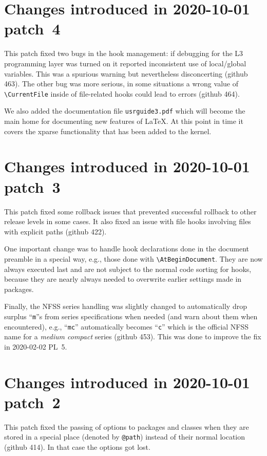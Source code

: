\documentclass{ltxguide}
\newcommand\Lpack[1]{\mbox{\textsf{#1}}}
\newcommand\ghissue[1]{github #1}
\newcommand\ghissue[1]{%
    \href{https://github.com/latex3/latex2e/issues/#1}{github #1}}
\begin{document}
\section{Changes introduced in 2020-10-01 patch~4}

This patch fixed two bugs in the hook management: if debugging for the
L3 programming layer was turned on it reported inconsistent use of
local/global variables. This was a spurious warning but nevertheless
disconcerting (\ghissue{463}). The other bug was more serious, in some
situations a wrong value of \verb=\CurrentFile= inside of file-related hooks
could lead to errors (\ghissue{464}).

We also added the documentation file \texttt{usrguide3.pdf} which
will become the main home for documenting new features of \LaTeX. At
this point in time it covers the \Lpack{xparse} functionality that has
been added to the kernel.

\section{Changes introduced in 2020-10-01 patch~3}

This patch fixed some rollback issues that prevented successful
rollback to other release levels in some cases.  It also fixed an issue
with file hooks involving files with explicit paths  (\ghissue{422}).

One important change was to handle hook declarations done in the
document preamble in a special way, e.g., those done with
\verb=\AtBeginDocument=. They are now always executed last and are not
subject to the normal code sorting for hooks, because they are nearly always
needed to overwrite earlier settings made in packages.

Finally, the NFSS series handling was slightly changed to
automatically drop surplus ``\texttt{m}''s from series specifications
when needed (and warn about them when encountered), e.g.,
``\texttt{mc}'' automatically becomes ``\texttt{c}'' which is the
official NFSS name for a \emph{medium compact} series (\ghissue{453}).
This was done to improve the fix in 2020-02-02 PL~5.

\section{Changes introduced in 2020-10-01 patch~2}

This patch fixed the passing of options to packages and classes when
they are stored in a special place (denoted by \verb=@path=)
instead of their normal location (\ghissue{414}). In that case the
options got lost.
\end{document}
